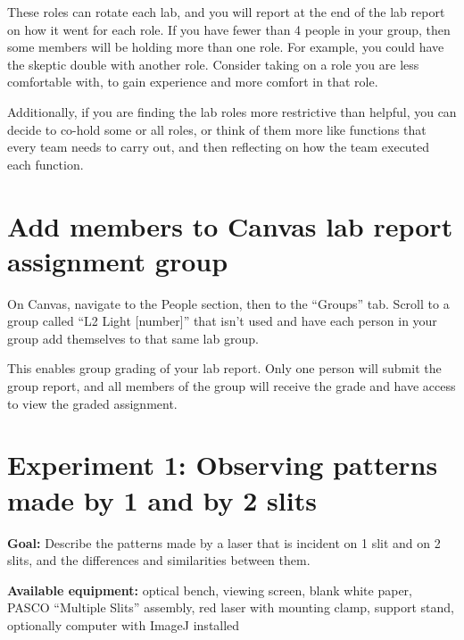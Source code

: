 These roles can rotate each lab, and you will report at the end of the lab report on how it went for each role. If you have fewer than 4 people in your group, then some members will be holding more than one role. For example, you could have the skeptic double with another role. Consider taking on a role you are less comfortable with, to gain experience and more comfort in that role.

Additionally, if you are finding the lab roles more restrictive than helpful, you can decide to co-hold some or all roles, or think of them more like functions that every team needs to carry out, and then reflecting on how the team executed each function.

\section{Add members to Canvas lab report assignment group}

\begin{steps}
	\item On Canvas, navigate to the People section, then to the ``Groups'' tab. Scroll to a group called ``L2 Light [number]'' that isn't used and have each person in your group add themselves to that same lab group.
\end{steps}

This enables group grading of your lab report. Only one person will submit the group report, and all members of the group will receive the grade and have access to view the graded assignment.

\section{Experiment 1: Observing patterns made by 1 and by 2 slits}\label{li:sec:exp1}

\textbf{Goal:} Describe the patterns made by a laser that is incident on 1 slit and on 2 slits, and the differences and similarities between them.

\textbf{Available equipment:} optical bench, viewing screen, blank white paper, PASCO ``Multiple Slits'' assembly, red laser with mounting clamp, support stand, optionally computer with ImageJ installed

